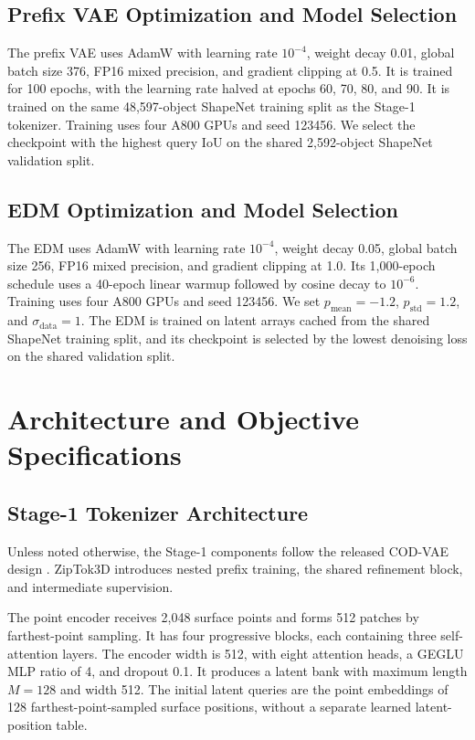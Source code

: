 \subsection{Prefix VAE Optimization and Model Selection}

The prefix VAE uses AdamW with learning rate $10^{-4}$,
weight decay 0.01, global batch size 376, FP16 mixed precision, and gradient
clipping at 0.5.  It is trained for 100 epochs, with the learning rate halved at
epochs 60, 70, 80, and 90. It is trained on the same 48,597-object ShapeNet
training split as the Stage-1 tokenizer. Training uses four A800 GPUs and seed
123456. We select the checkpoint with the highest query IoU on the shared
2,592-object ShapeNet validation split.

\subsection{EDM Optimization and Model Selection}

The EDM uses AdamW with learning rate $10^{-4}$, weight decay 0.05, global
batch size 256, FP16 mixed precision, and gradient clipping at 1.0. Its
1,000-epoch schedule uses a 40-epoch linear warmup followed by cosine decay to
$10^{-6}$. Training uses four A800 GPUs and seed 123456. We set
$p_{\mathrm{mean}}=-1.2$, $p_{\mathrm{std}}=1.2$, and
$\sigma_{\mathrm{data}}=1$. The EDM is trained on latent arrays cached from the
shared ShapeNet training split, and its checkpoint is selected by the lowest
denoising loss on the shared validation split.

\section{Architecture and Objective Specifications}
\label{sec:architecture}

\subsection{Stage-1 Tokenizer Architecture}

Unless noted otherwise, the Stage-1 components follow the released COD-VAE design
\citep{cho2025representing}. ZipTok3D introduces nested prefix training, the
shared refinement block, and intermediate supervision.

The point encoder receives 2,048 surface points and forms 512 patches by
farthest-point sampling. It has four progressive blocks, each containing three
self-attention layers. The encoder width is 512, with eight attention heads,
a GEGLU MLP ratio of 4, and dropout 0.1. It produces a latent bank with maximum
length $M=128$ and width 512. The initial latent queries are the point
embeddings of 128 farthest-point-sampled surface positions, without a separate
learned latent-position table.

